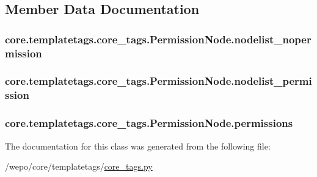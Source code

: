 \subsection{Member Data Documentation}
\hypertarget{classcore_1_1templatetags_1_1core__tags_1_1PermissionNode_ab3b7efaa62b6ac8b71cc33ae49356b19}{
\subsubsection[{nodelist\-\_\-nopermission}]{\setlength{\rightskip}{0pt plus 5cm}core.\-templatetags.\-core\-\_\-tags.\-Permission\-Node.\-nodelist\-\_\-nopermission}}\label{classcore_1_1templatetags_1_1core__tags_1_1PermissionNode_ab3b7efaa62b6ac8b71cc33ae49356b19}
\hypertarget{classcore_1_1templatetags_1_1core__tags_1_1PermissionNode_a702425b36ea18844eee836560b3c3215}{
\subsubsection[{nodelist\-\_\-permission}]{\setlength{\rightskip}{0pt plus 5cm}core.\-templatetags.\-core\-\_\-tags.\-Permission\-Node.\-nodelist\-\_\-permission}}\label{classcore_1_1templatetags_1_1core__tags_1_1PermissionNode_a702425b36ea18844eee836560b3c3215}
\hypertarget{classcore_1_1templatetags_1_1core__tags_1_1PermissionNode_a8f264cfa76767dba610e4a0b930a69e3}{
\subsubsection[{permissions}]{\setlength{\rightskip}{0pt plus 5cm}core.\-templatetags.\-core\-\_\-tags.\-Permission\-Node.\-permissions}}\label{classcore_1_1templatetags_1_1core__tags_1_1PermissionNode_a8f264cfa76767dba610e4a0b930a69e3}


The documentation for this class was generated from the following file\-:\begin{DoxyCompactItemize}
\item 
/wepo/core/templatetags/\hyperlink{core__tags_8py}{core\-\_\-tags.\-py}\end{DoxyCompactItemize}
